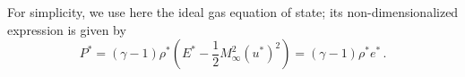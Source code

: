 \documentclass[preprint,10pt]{elsarticle}
\newcommand{\tcr}[1]{\textcolor{red}{#1}}
\newcommand{\tcb}[1]{\textcolor{blue}{#1}}
\begin{document}
For simplicity, we use here the ideal gas equation of state; its non-dimensionalized expression is given by
%
\begin{equation}
\label{eq:euler_eq2_eos}
P^* = \left( \gamma-1 \right) \rho^*\left(  E^* -\frac{1}{2} M_\infty^2 (u^*)^2 \right) = \left( \gamma-1 \right) \rho^* e^* \, .
\end{equation}


\end{document}

